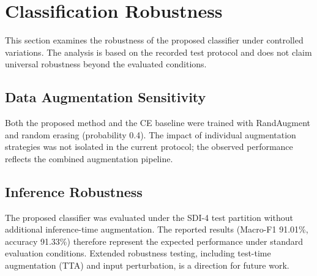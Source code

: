 
\section{Classification Robustness}
\label{sec:classification-robustness}

This section examines the robustness of the proposed classifier under controlled variations. The analysis is based on the recorded test protocol and does not claim universal robustness beyond the evaluated conditions.

\subsection{Data Augmentation Sensitivity}
\label{sec:augmentation-sensitivity}

Both the proposed method and the CE baseline were trained with RandAugment and random erasing (probability 0.4). The impact of individual augmentation strategies was not isolated in the current protocol; the observed performance reflects the combined augmentation pipeline.

\subsection{Inference Robustness}
\label{sec:inference-robustness}

The proposed classifier was evaluated under the SDI-4 test partition without additional inference-time augmentation. The reported results (Macro-F1 91.01\%, accuracy 91.33\%) therefore represent the expected performance under standard evaluation conditions. Extended robustness testing, including test-time augmentation (TTA) and input perturbation, is a direction for future work.
